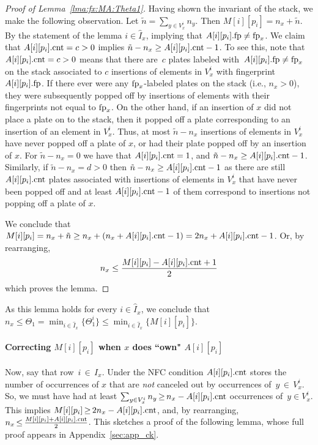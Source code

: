 \begin{proof}[Proof of Lemma~\ref{lma:fx:MA:Theta1}]
    Having shown the invariant of the stack, we make the following observation.  
    Let $\tilde{n} =  \sum_{y\in V_x^i} n_y$. Then $M[i][p_i] = n_x + \tilde{n}$. By the statement of the lemma $i \in \hat{I}_x$, implying that $A[i][p_i].\textup{fp} \neq \textup{fp}_x$.  
    We claim that $A[i][p_i].\textup{cnt}=c>0$ implies $\tilde{n}-n_x \geq A[i][p_i].\textup{cnt}-1$. To see this, note that $A[i][p_i].\textup{cnt}=c>0$ means that there are~$c$ plates labeled with~$A[i][p_i].\textup{fp} \neq \textup{fp}_x$ on the stack associated to $c$ insertions of elements in $V_x^i$ with fingerprint $A[i][p_i].\textup{fp}$. If there ever were any $\textup{fp}_x$-labeled plates on the stack (i.e., $n_x >0$), they were subsequently popped off by insertions of elements with their fingerprints not equal to $\textup{fp}_x$.  
    On the other hand, if an insertion of $x$ did not place a plate on to the stack, then it popped off a plate corresponding to an insertion of an element in $V_x^i$. Thus, at most $\tilde{n}-n_x$ insertions of elements in  
    $V_x^i$ have never popped off a plate of $x$, or had their plate popped off by an insertion of $x$.
    For $\tilde{n}-n_x = 0$ we have that $A[i][p_i].\textup{cnt}=1$,
    and $\tilde{n}-n_x \geq A[i][p_i].\textup{cnt} - 1$.  Similarly, if $\tilde{n}-n_x = d > 0$ then
    $\tilde{n}-n_x \geq A[i][p_i].\textup{cnt} - 1$ as there are still $A[i][p_i].\textup{cnt}$ plates associated with insertions of elements in $V_x^i$ that
    have never been popped off and at least $A[i][p_i].\textup{cnt}-1$ of them correspond to insertions not popping off a plate of $x$. 
    
    We conclude that 
    $
    M[i][p_i] = n_x + \tilde{n} \geq n_x + (n_x + A[i][p_i].\textup{cnt} -1) = 2n_x +  A[i][p_i].\textup{cnt} -1
    $.  Or, by rearranging,
    \[
    n_x \leq \frac{M[i][p_i] - A[i][p_i].\textup{cnt} + 1}{2}
    \] 
    which proves the lemma.
\end{proof}

\noindent
As this lemma holds for every $i \in \hat{I}_x$, we conclude that $n_x \leq \Theta_1=\min_{i \in \hat{I}_x}\{\Theta^i_1\} \leq \min_{i \in \hat{I}_x}\{M[i][p_i]\}$.  

\paragraph{Correcting $M[i][p_i]$ when $x$ does ``own" $A[i][p_i]$}
Now, say that row~$i \,{\in}\, I_x$. Under the NFC condition
$A[i][p_i].\textup{cnt}$ stores the number of occurrences of $x$ that are \textit{not} canceled out by occurrences of~$y \,{\in}\, V^i_x$. So,  
we must have had at least $\sum_{y \in V^i_x}n_y \,{\geq}\, n_x - A[i][p_i].\textup{cnt}$ occurrences of~$y \in V^i_x$. This implies $M[i][p_i] 
\,{\geq}\, 2n_x  - A[i][p_i].\textup{cnt}$, and, by rearranging, $n_x \,{\leq}\,  \frac{M[i][p_i] + A[i][p_i].\textup{cnt}}{2}$. This sketches a proof of the following lemma, whose full proof appears in Appendix~\ref{sec:app_ck}.

